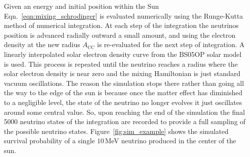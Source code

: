 Given an energy and initial position within the Sun
Eqn.~\eqref{eqn:mixing_schrodinger}
is evaluated numerically using the Runge-Kutta method of numerical integration.
At each step of the integration the neutrinos position is advanced radially
outward a small amount, and using the electron density at the new radius
$A_{\mathrm{CC}}$ is re-evaluated for the next step of integration.
A linearly interpolated solar electron density curve from the BS05OP solar model~\citep{bs_ssm} is used.
This process is repeated until the neutrino reaches a radius where
the solar electron density is near zero and the mixing Hamiltonian is
just standard vacuum oscillations.
The reason the simulation stops there rather than going all the way to the
edge of the sun is because once the matter effect has diminished to a negligible
level, the state of the neutrino no longer evolves it just oscillates around
some central value.
So, upon reaching the end of the simulation the final 5000 neutrino states of the
integration are recorded to provide a full sampling of the possible
neutrino states.
Figure~\ref{fig:sim_example} shows the simulated survival probability of a single
$10$\,MeV neutrino produced in the center of the sun.


